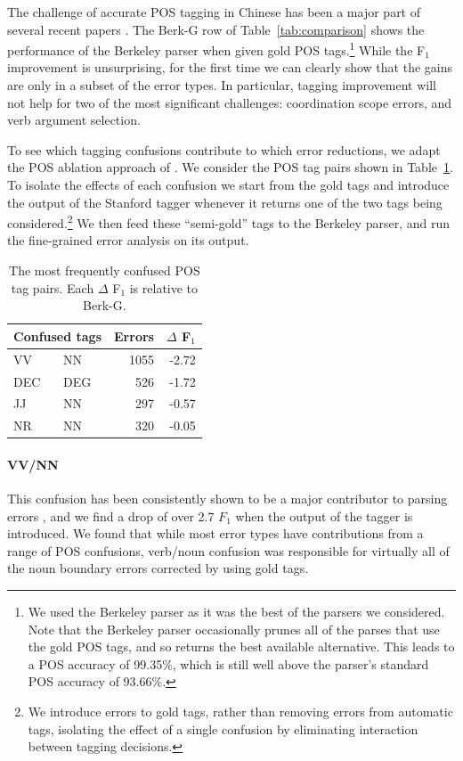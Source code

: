 The challenge of accurate POS tagging in Chinese has been a major part of
several recent papers
\parencite{Qian-Liu:2012:EMNLP,Jiang-etal:2009:ACL,Forst-Fang:2009:EACL}.  The
Berk-G row of Table~\ref{tab:comparison} shows the performance of the Berkeley
parser when given gold POS tags.\footnote{We used the Berkeley parser as it was
the best of the parsers we considered.  Note that the Berkeley parser
occasionally prunes all of the parses that use the gold POS tags,
and so returns the best available alternative.  This leads to a POS accuracy of
99.35\%, which is still well above the parser's standard POS accuracy of
93.66\%.}
While the F$_1$ improvement is unsurprising, for the
first time we can clearly show that the gains are only in a subset of the error
types.  In particular, tagging improvement will not help for two of the most
significant challenges: coordination scope errors, and verb argument
selection.

To see which tagging confusions contribute to which error reductions, we adapt the POS
ablation approach of \textcite{Tse-Curran:2012:NAACL-HLT}.  We consider the POS
tag pairs shown in Table~\ref{tab:pos-confusion}.  To isolate the effects of
each confusion we start from the gold tags and introduce the output of the
Stanford tagger whenever it returns one of the two tags being
considered.\footnote{We introduce errors to gold tags, rather than removing
errors from automatic tags, isolating the effect of a single confusion
by eliminating interaction between tagging decisions.}
We then feed these ``semi-gold'' tags to the
Berkeley parser, and run the fine-grained error analysis on its output.

\begin{table}
  \centering
  \begin{tabular}{|llrr|}
    \hline
      \multicolumn{2}{c}{Confused tags} & Errors & $\Delta$ F$_1$ \\
    \hline
    \hline
      VV  & NN  & 1055 & -2.72 \\
      DEC & DEG &  526 & -1.72 \\
      JJ  & NN  &  297 & -0.57 \\
      NR  & NN  &  320 & -0.05 \\
    \hline
  \end{tabular}
  \caption{\label{tab:pos-confusion}
    The most frequently confused POS tag pairs.
    Each $\Delta$ F$_1$ is relative to Berk-G.
  }
\end{table}

\paragraph{VV/NN}  This confusion has been consistently shown to be a major
contributor to parsing errors
\parencite{Levy-Manning:2003:ACL,Tse-Curran:2012:NAACL-HLT,Qian-Liu:2012:EMNLP},
and we find a drop of over 2.7 $F_1$ when the output of the tagger is
introduced.  We found that while most error types have contributions from a
range of POS confusions, verb/noun confusion was responsible for virtually all of
the noun boundary errors corrected by using gold tags.

